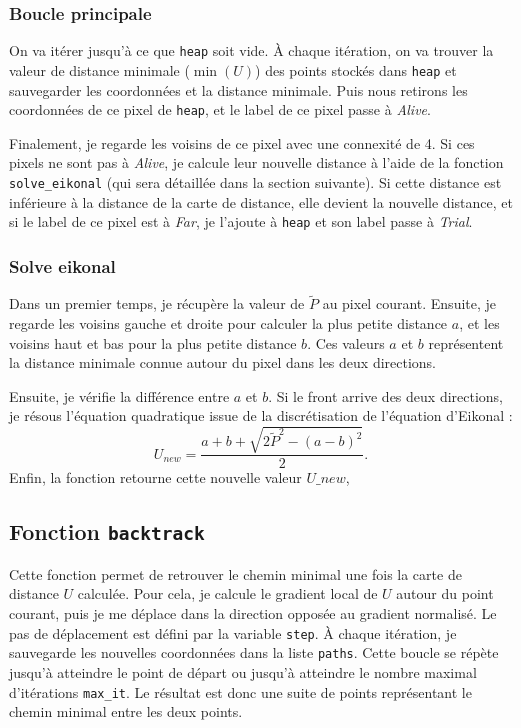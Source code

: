 \documentclass{article}
\begin{document}
\subsubsection{Boucle principale}
On va itérer jusqu'à ce que \texttt{heap} soit vide. À chaque itération, on va 
trouver la valeur de distance minimale ($\min(U)$) des points stockés dans 
\texttt{heap} et sauvegarder les coordonnées et la distance minimale. Puis nous 
retirons les coordonnées de ce pixel de \texttt{heap}, et le label de ce pixel 
passe à \textit{Alive}.

Finalement, je regarde les voisins de ce pixel avec une connexité de 4. 
Si ces pixels ne sont pas à \textit{Alive}, je calcule leur nouvelle distance à l'aide de la fonction 
\texttt{solve\_eikonal} (qui sera détaillée dans la section suivante). 
Si cette distance est inférieure à la distance de la carte de distance, elle devient la nouvelle distance, 
et si le label de ce pixel est à \textit{Far}, je l'ajoute à \texttt{heap} et son label passe à \textit{Trial}.


\subsubsection{Solve eikonal}

Dans un premier temps, je récupère la valeur de $\tilde{P}$ au pixel courant.  
Ensuite, je regarde les voisins gauche et droite pour calculer la plus petite 
distance $a$, et les voisins haut et bas pour la plus petite distance $b$.  
Ces valeurs $a$ et $b$ représentent la distance minimale connue autour du pixel 
dans les deux directions.  

Ensuite, je vérifie la différence entre $a$ et $b$.  
Si le front arrive des deux directions, je résous l'équation quadratique issue 
de la discrétisation de l'équation d'Eikonal :  
\[
U_{new} = \frac{a + b + \sqrt{2 \tilde{P}^2 - (a - b)^2}}{2}.
\]
Enfin, la fonction retourne cette nouvelle valeur $U\_{new}$, 

\subsection{Fonction \texttt{backtrack}}

Cette fonction permet de retrouver le chemin minimal une fois la carte de distance 
$U$ calculée. Pour cela, je calcule le gradient local de $U$ autour du point courant, 
puis je me déplace dans la direction opposée au gradient normalisé.  
Le pas de déplacement est défini par la variable \texttt{step}.  
À chaque itération, je sauvegarde les nouvelles coordonnées dans la liste 
\texttt{paths}. Cette boucle se répète jusqu'à atteindre le point de départ 
ou jusqu'à atteindre le nombre maximal d'itérations \texttt{max\_it}.  
Le résultat est donc une suite de points représentant le chemin minimal entre les 
deux points.
\end{document}
